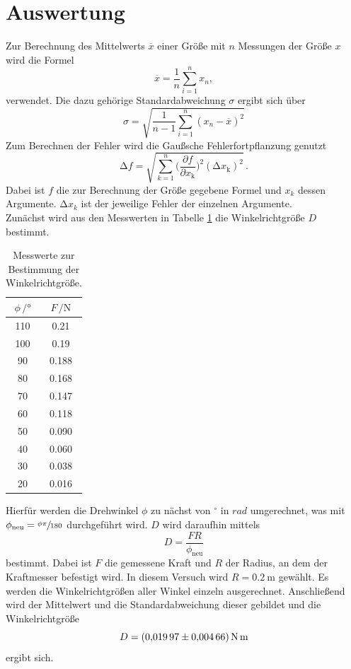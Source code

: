 \section{Auswertung}
\label{sec:Auswertung}
Zur Berechnung des Mittelwerts $\overline{x}$ einer Größe mit $n$ Messungen der Größe $x$ wird die Formel 
\begin{equation}
  \overline{x}=\frac{1}{n}\sum_{i=1}^n x_n,
  \label{eq:Mittelwert}
\end{equation} verwendet.
Die dazu gehörige Standardabweichung $\sigma$ ergibt sich über 
\begin{equation}
  \sigma=\sqrt{\frac{1}{n-1}\sum_{i=1}^n(x_n-\overline{x})^2}
  \label{eq:Standardabweichung}
\end{equation}
Zum Berechnen der Fehler wird die Gaußsche Fehlerfortpflanzung genutzt 
\begin{equation}
\increment f=\sqrt{\sum_{k=1}^{n}\biggl(\frac{\partial f}{\partial x_\text{k}}\biggr)^2(\increment x_\text{k})^2}\,.
\label{eq:gauss}
\end{equation}
Dabei ist $f$ die zur Berechnung der Größe gegebene Formel und $x_k$ dessen Argumente.
$\increment x_k$ ist der jeweilige Fehler der einzelnen Argumente.\\ \noindent 
\newpage
Zunächst wird aus den Messwerten in Tabelle \ref{tab:Winkelrichtgroesse}
die Winkelrichtgröße $D$ bestimmt.
\begin{table}[H]
  \centering
  \caption{Messwerte zur Bestimmung der Winkelrichtgröße.}
  \label{tab:Winkelrichtgroesse}
  \begin{tabular}{
  c c
  }
    \toprule
     $\phi \, / \unit{°}$ & $F\, / \unit{\newton}$\\
    \midrule
    110 & 0.21 \\
    100 & 0.19 \\
    90  & 0.188\\
    80  & 0.168\\
    70  & 0.147\\
    60  & 0.118\\
    50  & 0.090\\
    40  & 0.060\\
    30  & 0.038\\
    20  & 0.016\\
    \bottomrule
  \end{tabular}
\end{table}
Hierfür werden die Drehwinkel $\phi$ zu nächst von $^\circ$ in $rad$ umgerechnet, 
was mit $\phi_\text{neu} = \sfrac{\phi \pi}{180}$ durchgeführt wird.
$D$ wird daraufhin mittels
\begin{equation}
  D = \frac{F R}{\phi_\text{neu}}
\end{equation}
bestimmt.
Dabei ist $F$ die gemessene Kraft und $R$ der Radius, an dem der Kraftmesser befestigt wird.
In diesem Versuch wird $R = \SI{0.2}{\meter}$ gewählt.
Es werden die Winkelrichtgrößen aller Winkel einzeln ausgerechnet.
Anschließend wird der Mittelwert und die Standardabweichung dieser gebildet und die Winkelrichtgröße
\begin{equation*}
  D = \SI{0.01997 \pm 0.00466}{\N \meter}
\end{equation*}
ergibt sich.

